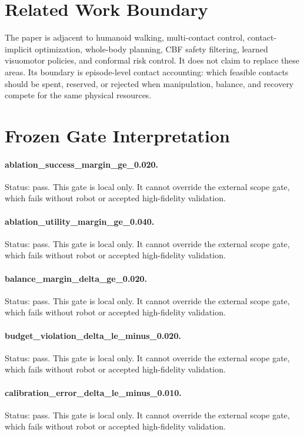 \documentclass{article}
\begin{document}
\section{Related Work Boundary}
The paper is adjacent to humanoid walking, multi-contact control, contact-implicit optimization, whole-body planning, CBF safety filtering, learned visuomotor policies, and conformal risk control. It does not claim to replace these areas. Its boundary is episode-level contact accounting: which feasible contacts should be spent, reserved, or rejected when manipulation, balance, and recovery compete for the same physical resources.
\clearpage
\appendix
\section{Frozen Gate Interpretation}
\paragraph{ablation\_success\_margin\_ge\_0.020.} Status: pass. This gate is local only. It cannot override the external scope gate, which fails without robot or accepted high-fidelity validation.
\paragraph{ablation\_utility\_margin\_ge\_0.040.} Status: pass. This gate is local only. It cannot override the external scope gate, which fails without robot or accepted high-fidelity validation.
\paragraph{balance\_margin\_delta\_ge\_0.020.} Status: pass. This gate is local only. It cannot override the external scope gate, which fails without robot or accepted high-fidelity validation.
\paragraph{budget\_violation\_delta\_le\_minus\_0.020.} Status: pass. This gate is local only. It cannot override the external scope gate, which fails without robot or accepted high-fidelity validation.
\paragraph{calibration\_error\_delta\_le\_minus\_0.010.} Status: pass. This gate is local only. It cannot override the external scope gate, which fails without robot or accepted high-fidelity validation.
\end{document}
